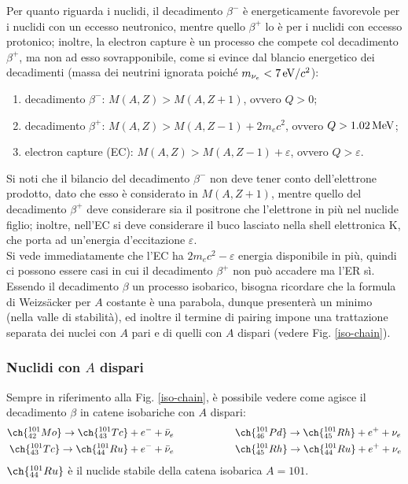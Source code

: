 Per quanto riguarda i nuclidi, il decadimento $ \beta^- $ è energeticamente favorevole per i nuclidi con un eccesso neutronico, mentre quello $ \beta^+ $ lo è per i nuclidi con eccesso protonico; inoltre, la electron capture è un processo che compete col decadimento $ \beta^+ $, ma non ad esso sovrapponibile, come si evince dal blancio energetico dei decadimenti (massa dei neutrini ignorata poiché $ m_{\nu_e} < 7 \,\mathrm{eV}/c^2 $):
\begin{enumerate}
	\item decadimento $ \beta^- $: $ M(A,Z) > M(A,Z + 1) $, ovvero $ Q > 0 $;
	\item decadimento $ \beta^+ $: $ M(A,Z) > M(A,Z - 1) + 2 m_e c^2 $, ovvero $ Q > 1.02\,\mathrm{MeV} $;
	\item electron capture (EC): $ M(A,Z) > M(A,Z - 1) + \varepsilon $, ovvero $ Q > \varepsilon $.
\end{enumerate}
Si noti che il bilancio del decadimento $ \beta^- $ non deve tener conto dell'elettrone prodotto, dato che esso è considerato in $ M(A,Z + 1) $, mentre quello del decadimento $ \beta^+ $ deve considerare sia il positrone che l'elettrone in più nel nuclide figlio; inoltre, nell'EC si deve considerare il buco lasciato nella shell elettronica K, che porta ad un'energia d'eccitazione $ \varepsilon $.\\
Si vede immediatamente che l'EC ha $ 2 m_e c^2 - \varepsilon $ energia disponibile in più, quindi ci possono essere casi in cui il decadimento $ \beta^+ $ non può accadere ma l'ER sì.\\
Essendo il decadimento $ \beta $ un processo isobarico, bisogna ricordare che la formula di Weizsäcker per $ A $ costante è una parabola, dunque presenterà un minimo (nella valle di stabilità), ed inoltre il termine di pairing impone una trattazione separata dei nuclei con $ A $ pari e di quelli con $ A $ dispari (vedere Fig. \ref{iso-chain}).

\subsubsection{Nuclidi con \texorpdfstring{$ A $}{TEXT} dispari}

Sempre in riferimento alla Fig. \ref{iso-chain}, è possibile vedere come agisce il decadimento $ \beta $ in catene isobariche con $ A $ dispari:
\begin{align*}
	\ch{^{101}_{42} Mo} \rightarrow \ch{^{101}_{43} Tc} + e^- + \bar{\nu}_e &\qquad\qquad\qquad \ch{^{101}_{46} Pd} \rightarrow \ch{^{101}_{45} Rh} + e^+ + \nu_e \\
	\ch{^{101}_{43} Tc} \rightarrow \ch{^{101}_{44} Ru} + e^- + \bar{\nu}_e &\qquad\qquad\qquad \ch{^{101}_{45} Rh} \rightarrow \ch{^{101}_{44} Ru} + e^+ + \nu_e
\end{align*}
$ \ch{^{101}_{44} Ru} $ è il nuclide stabile della catena isobarica $ A = 101 $.

